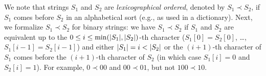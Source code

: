 \begin{problem}
\begin{questions}
We note that strings $S_1$ and $S_2$ are \emph{lexicographical ordered}, denoted by $S_1 \prec S_2$, if $S_1$ comes before $S_2$ in an alphabetical sort (e.g., as used in a dictionary). Next, we formalize $S_1 \prec S_2$ for binary strings: we have $S_1 \prec S_2$ if $S_1$ and $S_2$ are equivalent up to the $0\leq i \leq \min(\lvert S_1 \rvert, \lvert S_2 \rvert)$-th character ($S_1[0] = S_2[0]$,
\dots, $S_1[i-1] = S_2[i-1]$) and either $\lvert S_1 \rvert = i < \lvert S_2 \rvert$ or the $(i+1)$-th character of $S_1$ comes before the $(i+1)$-th character of $S_2$ (in which case $S_1[i] = 0$ and $S_2[i] = 1$). For example, $0 \prec 00$ and $00 \prec 01$, but not $100 \prec 10$. 



\end{questions}
\end{problem}

\SUBMITMSG{}
\DEFAULTGRADING{}

